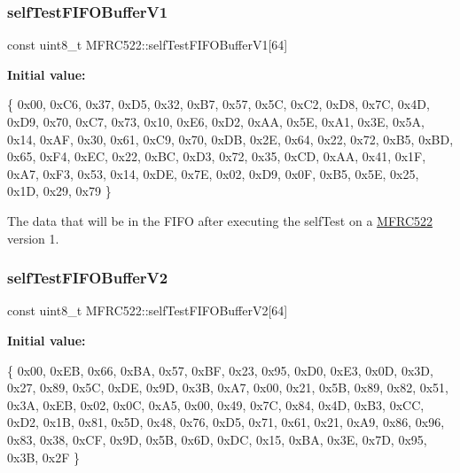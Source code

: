 \subsubsection{\texorpdfstring{self\+Test\+F\+I\+F\+O\+Buffer\+V1}{selfTestFIFOBufferV1}}
{\footnotesize\ttfamily const uint8\+\_\+t M\+F\+R\+C522\+::self\+Test\+F\+I\+F\+O\+Buffer\+V1\mbox{[}64\mbox{]}}

{\bfseries Initial value\+:}
\begin{DoxyCode}
\{
        0x00, 0xC6, 0x37, 0xD5, 0x32, 0xB7, 0x57, 0x5C,
        0xC2, 0xD8, 0x7C, 0x4D, 0xD9, 0x70, 0xC7, 0x73,
        0x10, 0xE6, 0xD2, 0xAA, 0x5E, 0xA1, 0x3E, 0x5A,
        0x14, 0xAF, 0x30, 0x61, 0xC9, 0x70, 0xDB, 0x2E,
        0x64, 0x22, 0x72, 0xB5, 0xBD, 0x65, 0xF4, 0xEC,
        0x22, 0xBC, 0xD3, 0x72, 0x35, 0xCD, 0xAA, 0x41,
        0x1F, 0xA7, 0xF3, 0x53, 0x14, 0xDE, 0x7E, 0x02,
        0xD9, 0x0F, 0xB5, 0x5E, 0x25, 0x1D, 0x29, 0x79
    \}
\end{DoxyCode}


The data that will be in the F\+I\+FO after executing the self\+Test on a \mbox{\hyperlink{class_m_f_r_c522}{M\+F\+R\+C522}} version 1. 

\mbox{\label{class_m_f_r_c522_a6973b73a8a922ac09b9d89489bdbc333}} 
\subsubsection{\texorpdfstring{self\+Test\+F\+I\+F\+O\+Buffer\+V2}{selfTestFIFOBufferV2}}
{\footnotesize\ttfamily const uint8\+\_\+t M\+F\+R\+C522\+::self\+Test\+F\+I\+F\+O\+Buffer\+V2\mbox{[}64\mbox{]}}

{\bfseries Initial value\+:}
\begin{DoxyCode}
\{
        0x00, 0xEB, 0x66, 0xBA, 0x57, 0xBF, 0x23, 0x95,
        0xD0, 0xE3, 0x0D, 0x3D, 0x27, 0x89, 0x5C, 0xDE,
        0x9D, 0x3B, 0xA7, 0x00, 0x21, 0x5B, 0x89, 0x82,
        0x51, 0x3A, 0xEB, 0x02, 0x0C, 0xA5, 0x00, 0x49,
        0x7C, 0x84, 0x4D, 0xB3, 0xCC, 0xD2, 0x1B, 0x81,
        0x5D, 0x48, 0x76, 0xD5, 0x71, 0x61, 0x21, 0xA9,
        0x86, 0x96, 0x83, 0x38, 0xCF, 0x9D, 0x5B, 0x6D,
        0xDC, 0x15, 0xBA, 0x3E, 0x7D, 0x95, 0x3B, 0x2F
    \}
\end{DoxyCode}


